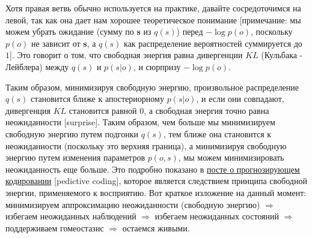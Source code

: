 \documentclass[twoside,leqno, 11pt]{article}
\begin{document}
	\begin{figure}[h]
		\label{ris:image}
	\end{figure}
	
	Хотя правая ветвь обычно используется на практике, давайте сосредоточимся на левой, так как она дает нам хорошее теоретическое понимание [примечание: мы можем убрать ожидание (сумму по \textbf{s} из $q(s)$) перед $-\log p(o)$, поскольку $p(o)$ не зависит от \textbf{s}, а $q(s)$ как распределение вероятностей суммируется до $1$]. Это говорит о том, что свободная энергия равна дивергенции $KL$ (Кульбака - Лейблера) между $q(s)$ и $p(s|o)$, и сюрпризу $-\log p(o)$.
	
	\begin{figure}[h]	
		\label{ris:image}
	\end{figure}
	
	Таким образом, минимизируя свободную энергию, произвольное распределение $q(s)$ становится ближе к апостериорному $p(s|o)$, и если они совпадают, дивергенция $KL$ становится равной $0$, а свободная энергия точно равна неожиданности [surprise]. Таким образом, чем больше мы минимизируем свободную энергию путем подгонки $q(s)$, тем ближе она становится к неожиданности (поскольку это верхняя граница), а минимизируя свободную энергию путем изменения параметров $p(o,s)$, мы можем минимизировать неожиданность еще больше. Это подробно показано в  \href{https://medium.com/@solopchuk/intuitions-on-predictive-coding-and-the-free-energy-principle-3fc5bcedc754}{посте о прогнозирующем кодировании} [pedictive coding], которое является следствием принципа свободной энергии, применяемого к восприятию. Вот краткое изложение на данный момент: минимизируем аппроксимацию неожиданности (свободную энергию) $\Rightarrow$ избегаем неожиданных наблюдений $\Rightarrow$ избегаем неожиданных состояний $\Rightarrow$ поддерживаем гомеостазис $\Rightarrow$ остаемся живыми.
	
\end{document}
